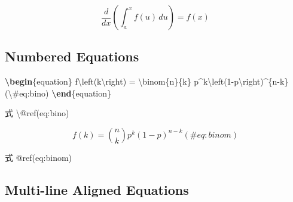 \documentclass[oneside]{book}
\newenvironment{Shaded}{\begin{snugshade}}{\end{snugshade}}
\newcommand{\ExtensionTok}[1]{#1}
\newcommand{\FunctionTok}[1]{\textcolor[rgb]{0.00,0.00,0.00}{#1}}
\newcommand{\KeywordTok}[1]{\textcolor[rgb]{0.13,0.29,0.53}{\textbf{#1}}}
\newcommand{\NormalTok}[1]{#1}
\newcommand{\SpecialCharTok}[1]{\textcolor[rgb]{0.00,0.00,0.00}{#1}}
\newcommand{\SpecialStringTok}[1]{\textcolor[rgb]{0.31,0.60,0.02}{#1}}
\begin{document}
\begin{equation*} 
\frac{d}{dx}\left( \int_{a}^{x} f(u)\,du\right)=f(x)
\end{equation*}

\hypertarget{numbered-equations-1}{%
\subsection{Numbered Equations}\label{numbered-equations-1}}

\begin{Shaded}
\begin{Highlighting}[]
\KeywordTok{\textbackslash{}begin}\NormalTok{\{}\ExtensionTok{equation}\NormalTok{\}}\SpecialStringTok{ }
\SpecialStringTok{  f}\SpecialCharTok{\textbackslash{}left}\SpecialStringTok{(k}\SpecialCharTok{\textbackslash{}right}\SpecialStringTok{) = }\SpecialCharTok{\textbackslash{}binom}\SpecialStringTok{\{n\}\{k\} p^k}\SpecialCharTok{\textbackslash{}left}\SpecialStringTok{(1-p}\SpecialCharTok{\textbackslash{}right}\SpecialStringTok{)^\{n-k\}}
\SpecialStringTok{  (}\SpecialCharTok{\textbackslash{}#}\SpecialStringTok{eq:bino)}
\KeywordTok{\textbackslash{}end}\NormalTok{\{}\ExtensionTok{equation}\NormalTok{\} }

\NormalTok{式 }\FunctionTok{\textbackslash{}@ref}\NormalTok{(eq:bino)}
\end{Highlighting}
\end{Shaded}

\begin{equation} 
  f\left(k\right) = \binom{n}{k} p^k\left(1-p\right)^{n-k}
  (\#eq:binom)
\end{equation}

式 @ref(eq:binom)

\hypertarget{multi-line-aligned-equations-1}{%
\subsection{Multi-line Aligned Equations}\label{multi-line-aligned-equations-1}}
\end{document}
